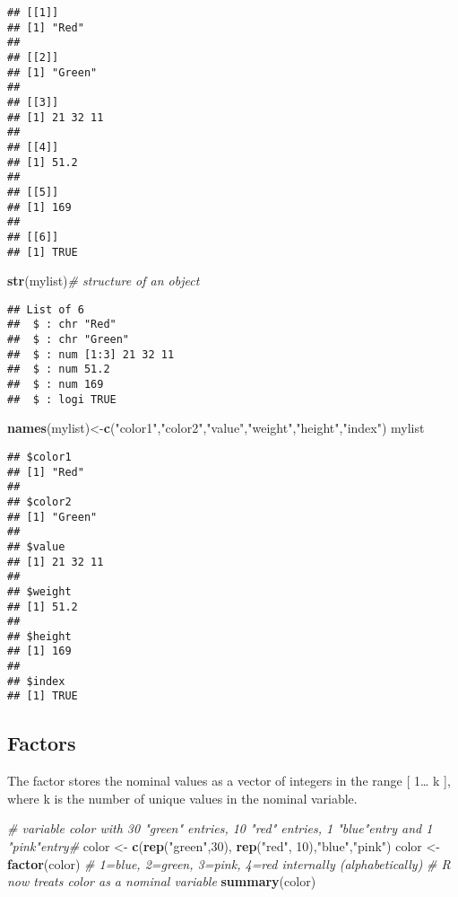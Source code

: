 \documentclass[]{book}
\newenvironment{Shaded}{\begin{snugshade}}{\end{snugshade}}
\newcommand{\KeywordTok}[1]{\textcolor[rgb]{0.13,0.29,0.53}{\textbf{#1}}}
\newcommand{\DecValTok}[1]{\textcolor[rgb]{0.00,0.00,0.81}{#1}}
\newcommand{\StringTok}[1]{\textcolor[rgb]{0.31,0.60,0.02}{#1}}
\newcommand{\CommentTok}[1]{\textcolor[rgb]{0.56,0.35,0.01}{\textit{#1}}}
\newcommand{\NormalTok}[1]{#1}
\theoremstyle{definition}
\theoremstyle{definition}
\theoremstyle{definition}
\theoremstyle{remark}
\begin{document}
\begin{verbatim}
## [[1]]
## [1] "Red"
## 
## [[2]]
## [1] "Green"
## 
## [[3]]
## [1] 21 32 11
## 
## [[4]]
## [1] 51.2
## 
## [[5]]
## [1] 169
## 
## [[6]]
## [1] TRUE
\end{verbatim}

\begin{Shaded}
\begin{Highlighting}[]
\KeywordTok{str}\NormalTok{(mylist)}\CommentTok{# structure of an object }
\end{Highlighting}
\end{Shaded}

\begin{verbatim}
## List of 6
##  $ : chr "Red"
##  $ : chr "Green"
##  $ : num [1:3] 21 32 11
##  $ : num 51.2
##  $ : num 169
##  $ : logi TRUE
\end{verbatim}

\begin{Shaded}
\begin{Highlighting}[]
\KeywordTok{names}\NormalTok{(mylist)<-}\KeywordTok{c}\NormalTok{(}\StringTok{"color1"}\NormalTok{,}\StringTok{"color2"}\NormalTok{,}\StringTok{"value"}\NormalTok{,}\StringTok{"weight"}\NormalTok{,}\StringTok{"height"}\NormalTok{,}\StringTok{"index"}\NormalTok{)}
\NormalTok{mylist}
\end{Highlighting}
\end{Shaded}

\begin{verbatim}
## $color1
## [1] "Red"
## 
## $color2
## [1] "Green"
## 
## $value
## [1] 21 32 11
## 
## $weight
## [1] 51.2
## 
## $height
## [1] 169
## 
## $index
## [1] TRUE
\end{verbatim}

\subsection{Factors}\label{factors}

The factor stores the nominal values as a vector of integers in the
range {[} 1\ldots{} k {]}, where k is the number of unique values in the
nominal variable.

\begin{Shaded}
\begin{Highlighting}[]
\CommentTok{# variable color with 30 "green" entries, 10 "red" entries, 1 "blue"entry and 1 "pink"entry#}
\NormalTok{color <-}\StringTok{ }\KeywordTok{c}\NormalTok{(}\KeywordTok{rep}\NormalTok{(}\StringTok{"green"}\NormalTok{,}\DecValTok{30}\NormalTok{), }\KeywordTok{rep}\NormalTok{(}\StringTok{"red"}\NormalTok{, }\DecValTok{10}\NormalTok{),}\StringTok{"blue"}\NormalTok{,}\StringTok{"pink"}\NormalTok{) }
\NormalTok{color <-}\StringTok{ }\KeywordTok{factor}\NormalTok{(color) }
\CommentTok{# 1=blue, 2=green, 3=pink, 4=red internally (alphabetically)}
\CommentTok{# R now treats color as a nominal variable }
\KeywordTok{summary}\NormalTok{(color)}
\end{Highlighting}
\end{Shaded}
\end{document}
